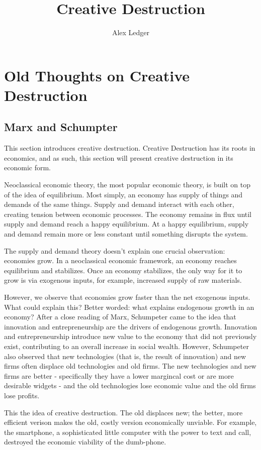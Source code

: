 \documentclass[11pt]{article}
\title{Creative Destruction}
\author{Alex Ledger}
\begin{document}
\maketitle

\section{Old Thoughts on Creative Destruction}
\subsection{Marx and Schumpter}
This section introduces creative destruction.
Creative Destruction has its roots in economics, and as such, this section will present creative destruction in its economic form.

Neoclassical economic theory, the most popular economic theory, is built on top of the idea of equilibrium.
Most simply, an economy has supply of things and demands of the same things. 
Supply and demand interact with each other, creating tension between economic processes.
The economy remains in flux until supply and demand reach a happy equilibrium.
At a happy equilibrium, supply and demand remain more or less constant until something disrupts the system.

The supply and demand theory doesn't explain one crucial observation: economies grow.
In a neoclassical economic framework, an economy reaches equilibrium and stabilizes.
Once an economy stabilizes, the only way for it to grow is via exogenous inputs, for example, increased supply of raw materials.

However, we observe that economies grow faster than the net exogenous inputs.
What could explain this?
Better worded: what explains endogenous growth in an economy?
After a close reading of Marx, Schumpeter came to the idea that innovation and entrepreneurship are the drivers of endogenous growth.
Innovation and entrepreneurship introduce new value to the economy that did not previously exist, contributing to an overall increase in social wealth.
However, Schumpeter also observed that new technologies (that is, the result of innovation)  and new firms often displace old technologies and old firms.
The new technologies and new firms are better - specifically they have a lower margincal cost or are more desirable widgets - and the old technologies lose economic value and the old firms lose profits.

This the idea of creative destruction.
The old displaces new; the better, more efficient verison makes the old, costly version economically unviable.
For example, the smartphone, a sophisticated little computer with the power to text and call, destroyed the economic viability of the dumb-phone.
\end{document}
